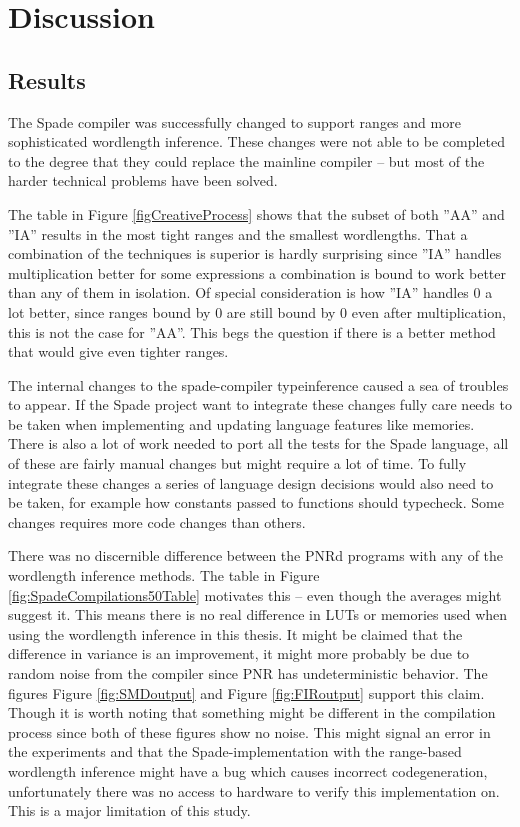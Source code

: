 \chapter{Discussion}
\label{cha:Discussion}

\section{Results}
The Spade compiler was successfully changed to support ranges and more sophisticated wordlength inference. These changes were not able to be completed to the degree that they could replace the mainline compiler -- but most of the harder technical problems have been solved. 

The table in Figure \ref{figCreativeProcess} shows that the subset of both ''AA'' and ''IA'' results in the most tight ranges and the smallest wordlengths. That a combination of the techniques is superior is hardly surprising since ''IA'' handles multiplication better for some expressions a combination is bound to work better than any of them in isolation. Of special consideration is how ''IA'' handles $0$ a lot better, since ranges bound by 0 are still bound by $0$ even after multiplication, this is not the case for ''AA''. This begs the question if there is a better method that would give even tighter ranges.

The internal changes to the spade-compiler typeinference caused a sea of troubles to appear. If the Spade project want to integrate these changes fully care needs to be taken when implementing and updating language features like memories. There is also a lot of work needed to port all the tests for the Spade language, all of these are fairly manual changes but might require a lot of time. To fully integrate these changes a series of language design decisions would also need to be taken, for example how constants passed to functions should typecheck. Some changes requires more code changes than others.

There was no discernible difference between the PNRd programs with any of the wordlength inference methods. The table in Figure \ref{fig:SpadeCompilations50Table} motivates this -- even though the averages might suggest it. This means there is no real difference in LUTs or memories used when using the wordlength inference in this thesis. It might be claimed that the difference in variance is an improvement, it might more probably be due to random noise from the compiler since PNR has undeterministic behavior. The figures Figure \ref{fig:SMDoutput} and Figure \ref{fig:FIRoutput} support this claim. Though it is worth noting that something might be different in the compilation process since both of these figures show no noise. This might signal an error in the experiments and that the Spade-implementation with the range-based wordlength inference might have a bug which causes incorrect codegeneration, unfortunately there was no access to hardware to verify this implementation on. This is a major limitation of this study.

